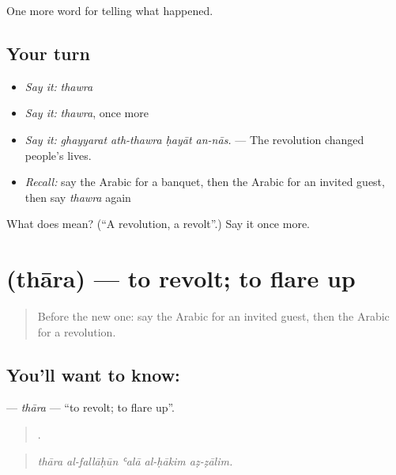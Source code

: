 \begin{grammarlens}[title={What you've built}]
One more word for telling what happened.
\end{grammarlens}

\subsection*{Your turn}
\begin{itemize}
\raggedright
  \item \emph{Say it:} \emph{thawra}
  \item \emph{Say it:} \emph{thawra}, once more
  \item \emph{Say it:} \emph{ghayyarat ath-thawra ḥayāt an-nās.} — The revolution changed people’s lives.
  \item \emph{Recall:} say the Arabic for a banquet, then the Arabic for an invited guest, then say \emph{thawra} again
\end{itemize}

\begin{tcolorbox}[breakable,colback=teal!4,colframe=teal!35!black,title={Before you move on}]
What does  mean? (\textquotedblleft{}A revolution, a revolt\textquotedblright{}.) Say it once more.
\end{tcolorbox}
\section[\texorpdfstring{\ar{ثار} (thāra)}{ثار (thāra)}]{ (thāra) — to revolt; to flare up}

\label{lesson:AR-C329-thara}



\begin{quote}
Before the new one: say the Arabic for an invited guest, then the Arabic for a revolution.
\end{quote}

\subsection*{You'll want to know: }
\textbf{} — \emph{thāra} — \textquotedblleft{}to revolt; to flare up\textquotedblright{}.

\begin{quote}
    .
\end{quote}

\begin{quote}
\emph{thāra al-fallāḥūn ʿalā al-ḥākim aẓ-ẓālim.}
\end{quote}

